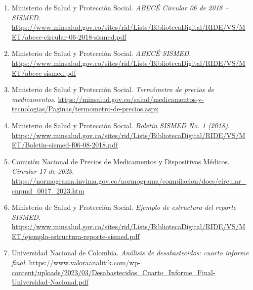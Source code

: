 \documentclass[10pt,twoside,xcolor=table,x11anmes]{IEEEtran}
\begin{document}
\begin{enumerate}
  \item Ministerio de Salud y Protección Social. \textit{ABECÉ Circular 06 de 2018 -- SISMED}. \url{https://www.minsalud.gov.co/sites/rid/Lists/BibliotecaDigital/RIDE/VS/MET/abece-circular-06-2018-sismed.pdf}

  \item Ministerio de Salud y Protección Social. \textit{ABECÉ SISMED}. \url{https://www.minsalud.gov.co/sites/rid/Lists/BibliotecaDigital/RIDE/VS/MET/abece-sismed.pdf}

  \item Ministerio de Salud y Protección Social. \textit{Termómetro de precios de medicamentos}. \url{https://minsalud.gov.co/salud/medicamentos-y-tecnologias/Paginas/termometro-de-precios.aspx}

  \item Ministerio de Salud y Protección Social. \textit{Boletín SISMED No. 1 (2018)}. \url{https://www.minsalud.gov.co/sites/rid/Lists/BibliotecaDigital/RIDE/VS/MET/Boletin-sismed-f06-08-2018.pdf}

  \item Comisión Nacional de Precios de Medicamentos y Dispositivos Médicos. \textit{Circular 17 de 2023}. \url{https://normograma.invima.gov.co/normograma/compilacion/docs/circular_cnpmd_0017_2023.htm}

  \item Ministerio de Salud y Protección Social. \textit{Ejemplo de estructura del reporte SISMED}. \url{https://www.minsalud.gov.co/sites/rid/Lists/BibliotecaDigital/RIDE/VS/MET/ejemplo-estructura-reporte-sismed.pdf}

  \item Universidad Nacional de Colombia. \textit{Análisis de desabastecidos: cuarto informe final}. \url{https://www.valoraanalitik.com/wp-content/uploads/2023/03/Desabastecidos_Cuarto_Informe_Final-Universidad-Nacional.pdf}


\end{enumerate}
\end{document}

